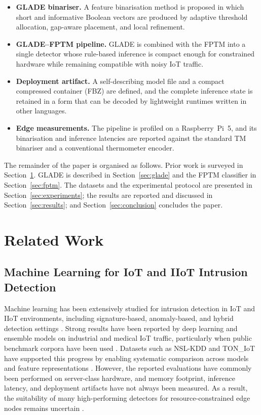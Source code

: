 \documentclass[journal,twoside,web]{ieeecolor}
\begin{document}
\begin{itemize}
    \item \textbf{GLADE binariser.} A feature binarisation method is proposed in which short and informative Boolean vectors are produced by adaptive threshold allocation, gap-aware placement, and local refinement.

    \item \textbf{GLADE--FPTM pipeline.} GLADE is combined with the FPTM into a single detector whose rule-based inference is compact enough for constrained hardware while remaining compatible with noisy IoT traffic.

    \item \textbf{Deployment artifact.} A self-describing model file and a compact compressed container (FBZ) are defined, and the complete inference state is retained in a form that can be decoded by lightweight runtimes written in other languages.

    \item \textbf{Edge measurements.} The pipeline is profiled on a Raspberry~Pi~5, and its binarisation and inference latencies are reported against the standard TM binariser and a conventional thermometer encoder.
\end{itemize}

The remainder of the paper is organised as follows. Prior work is surveyed in Section~\ref{sec:related}. GLADE is described in Section~\ref{sec:glade} and the FPTM classifier in Section~\ref{sec:fptm}. The datasets and the experimental protocol are presented in Section~\ref{sec:experiments}; the results are reported and discussed in Section~\ref{sec:results}; and Section~\ref{sec:conclusion} concludes the paper.


\section{Related Work}
\label{sec:related}

\subsection{Machine Learning for IoT and IIoT Intrusion Detection}

Machine learning has been extensively studied for intrusion detection in IoT and IIoT environments, including signature-based, anomaly-based, and hybrid detection settings \cite{hussain2020ml, algaradi2020survey}. Strong results have been reported by deep learning and ensemble models on industrial and medical IoT traffic, particularly when public benchmark corpora have been used \cite{wang2023lightweight, jouhari2024lightweight, hady2020wustl}. Datasets such as NSL-KDD and TON\_IoT have supported this progress by enabling systematic comparison across models and feature representations \cite{tavallaee2009nslkdd, moustafa2021toniot}. However, the reported evaluations have commonly been performed on server-class hardware, and memory footprint, inference latency, and deployment artifacts have not always been measured. As a result, the suitability of many high-performing detectors for resource-constrained edge nodes remains uncertain \cite{hussain2020ml, algaradi2020survey}.
\end{document}

